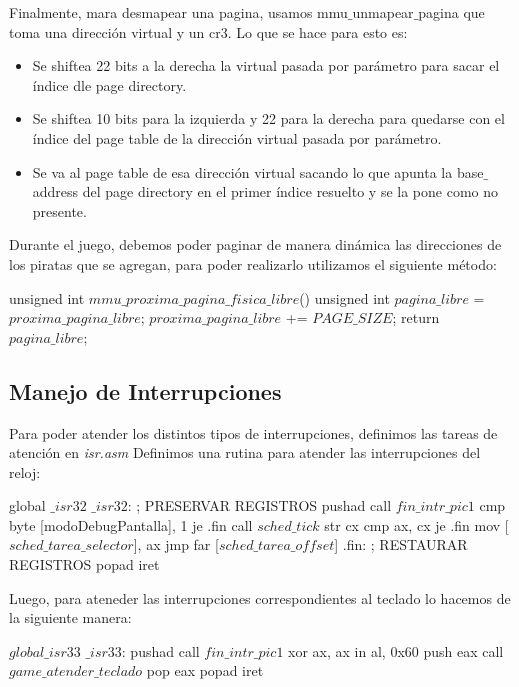 Finalmente, mara desmapear una pagina, usamos mmu$\_$unmapear$\_$pagina que toma una dirección virtual y un cr3. Lo que se hace para esto es:
\begin{itemize}
	\item Se shiftea 22 bits a la derecha la virtual pasada por parámetro para sacar el índice dle page directory.
	\item Se shiftea 10 bits para la izquierda y 22 para la derecha para quedarse con el índice del page table de la dirección virtual pasada por parámetro.
	\item Se va al page table de esa dirección virtual sacando lo que apunta la base$\_$address del page directory en el primer índice resuelto y se la pone como no presente.
\end{itemize}

Durante el juego, debemos poder paginar de manera din\'amica las direcciones de los piratas que se agregan, para poder realizarlo utilizamos el siguiente m\'etodo:
\begin{algorithmic}
    \State \tab unsigned int $mmu\_proxima\_pagina\_fisica\_libre$() {
  \State \tab \tab unsigned int $pagina\_libre$ = $proxima\_pagina\_libre$;
  \State \tab \tab $proxima\_pagina\_libre$ += $PAGE\_SIZE$;
  \State \tab \tab return $pagina\_libre$;
\State \tab }
\end{algorithmic}


\subsection{Manejo de Interrupciones}
Para poder atender los distintos tipos de interrupciones, definimos las tareas de atenci\'on en \textit{isr.asm}
Definimos una rutina para atender las interrupciones del reloj:
\begin{algorithmic}
    \State \tab global $\_isr32$
\State \tab $\_isr32$:
  \State \tab \tab; PRESERVAR REGISTROS
  \State \tab \tab pushad
  \State \tab \tab call $fin\_intr\_pic1$
  \State \tab \tab cmp byte [modoDebugPantalla], 1
  \State \tab \tab je .fin
\State \tab \tab  call $sched\_tick$
  \State \tab \tab str cx
  \State \tab \tab cmp ax, cx
  \State \tab \tab je .fin
  \State \tab \tab mov [$sched\_tarea\_selector$], ax
  \State \tab \tab jmp far [$sched\_tarea\_offset$]
\State \tab \tab .fin:
  \State \tab \tab ; RESTAURAR REGISTROS
  \State \tab \tab popad
  \State \tab \tab iret
\end{algorithmic}

Luego, para ateneder las interrupciones correspondientes al teclado lo hacemos de la siguiente manera:
\begin{algorithmic}
    \State \tab $global \_isr33$
\State \tab \tab $\_isr33$:
  \State \tab \tab pushad
  \State \tab \tab call $fin\_intr\_pic1$
  \State \tab \tab xor ax, ax
  \State \tab \tab in al, 0x60
  \State \tab \tab push eax
  \State \tab \tab call $game\_atender\_teclado$
  \State \tab \tab pop eax
  \State \tab \tab popad
  \State \tab \tab iret
\end{algorithmic}

